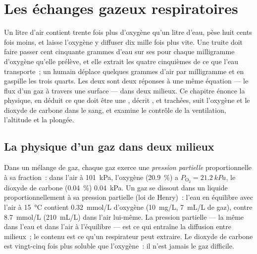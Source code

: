 \chapter{Les échanges gazeux respiratoires}\label{ch:b1:gas-exchange}

Un litre d'air contient trente fois plus d'oxygène qu'un litre d'eau,
pèse huit cents fois moins, et laisse l'oxygène y diffuser dix mille
fois plus vite. Une truite doit faire passer cent cinquante grammes
d'eau sur ses  pour chaque milligramme d'oxygène qu'elle
prélève, et elle extrait les quatre cinquièmes de ce que l'eau
transporte~; un humain déplace quelques grammes d'air par milligramme
et en gaspille les trois quarts. Les deux  sont deux réponses à
une même équation --- le flux d'un gaz à travers une surface --- dans
deux milieux. Ce chapitre énonce la physique, en déduit ce que doit
être une , décrit ,  et trachées,
suit l'oxygène et le dioxyde de carbone dans le sang, et examine le
contrôle de la ventilation, l'altitude et la plongée.

\section{La physique d'un gaz dans deux milieux}

\begin{definition}\label{def:b1:gas-exchange:partial}
Dans un mélange de gaz, chaque gaz exerce une \emph{pression
partielle} proportionnelle à sa fraction~: dans l'air à \qty{101}{kPa},
l'oxygène (\qty{20.9}{\%}) a $P_{\mathrm{O_2}} = \qty{21.2}{kPa}$, le
dioxyde de carbone (\qty{0.04}{\%}) \qty{0.04}{kPa}. Un gaz se dissout
dans un liquide proportionnellement à sa pression partielle (loi de
Henry)~: l'eau en équilibre avec l'air à \qty{15}{\celsius} contient
\qty{0.32}{mmol/L} d'oxygène (\qty{10}{mg/L}, \qty{7}{mL/L} de gaz),
contre \qty{8.7}{mmol/L} (\qty{210}{mL/L}) dans l'air lui-même. La
pression partielle --- la même dans l'eau et dans l'air à l'équilibre
--- est ce qui entraîne la diffusion entre milieux~; le contenu est ce
qu'un respirateur peut extraire. Le dioxyde de carbone est vingt-cinq
fois plus soluble que l'oxygène~: il n'est jamais le gaz difficile.
\end{definition}

